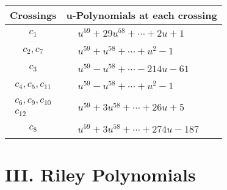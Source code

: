 \documentclass[1p]{elsarticle_modified}
\theoremstyle{definition}
\begin{document}
\begin{tabular}{m{50pt}|m{274pt}}
Crossings & \hspace{64pt}u-Polynomials at each crossing \\
\hline $$\begin{aligned}c_{1}\end{aligned}$$&$\begin{aligned}
&u^{59}+29 u^{58}+\cdots+2 u+1
\end{aligned}$\\
\hline $$\begin{aligned}c_{2},c_{7}\end{aligned}$$&$\begin{aligned}
&u^{59}+u^{58}+\cdots+u^2-1
\end{aligned}$\\
\hline $$\begin{aligned}c_{3}\end{aligned}$$&$\begin{aligned}
&u^{59}- u^{58}+\cdots-214 u-61
\end{aligned}$\\
\hline $$\begin{aligned}c_{4},c_{5},c_{11}\end{aligned}$$&$\begin{aligned}
&u^{59}- u^{58}+\cdots+u^2-1
\end{aligned}$\\
\hline $$\begin{aligned}c_{6},c_{9},c_{10}\\c_{12}\end{aligned}$$&$\begin{aligned}
&u^{59}+3 u^{58}+\cdots+26 u+5
\end{aligned}$\\
\hline $$\begin{aligned}c_{8}\end{aligned}$$&$\begin{aligned}
&u^{59}+3 u^{58}+\cdots+274 u-187
\end{aligned}$\\
\hline
\end{tabular}\newpage\renewcommand{\arraystretch}{1}
\centering \section*{ III. Riley Polynomials}
\end{document}
